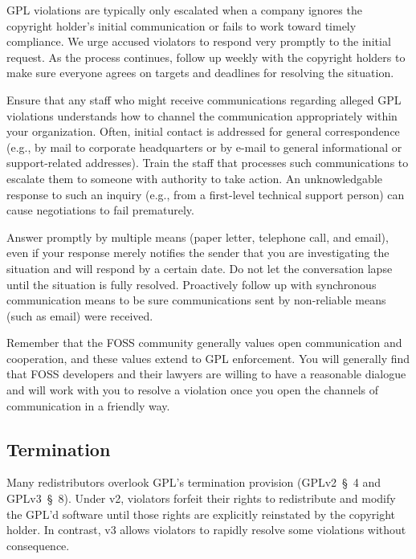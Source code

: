 \documentclass[letterpaper]{fixme}
\begin{document}
GPL violations are typically only escalated when a company ignores the
copyright holder's initial communication or fails to work toward timely
compliance.  We urge accused violators to respond very promptly to the
initial request.  As the process continues, follow up weekly with the
copyright holders to make sure everyone agrees on targets and deadlines
for resolving the situation.

Ensure that any staff who might receive communications regarding alleged
GPL violations understands how to channel the communication appropriately
within your organization.  Often, initial contact is addressed for general
correspondence (e.g., by mail to corporate headquarters or by e-mail to
general informational or support-related addresses).  Train the staff that
processes such communications to escalate them to someone with authority
to take action.  An unknowledgable response to such an inquiry (e.g., from
a first-level technical support person) can cause negotiations to fail
prematurely.

Answer promptly by multiple means (paper letter, telephone call, and
email), even if your response merely notifies the sender that you are
investigating the situation and will respond by a certain date.  Do not
let the conversation lapse until the situation is fully resolved.
Proactively follow up with synchronous communication means to be sure
communications sent by non-reliable means (such as email) were received.

Remember that the FOSS community generally values open communication and
cooperation, and these values extend to GPL enforcement.  You will
generally find that FOSS developers and their lawyers are willing to
have a reasonable dialogue and will work with you to resolve a violation
once you open the channels of communication in a friendly way.

\subsection{Termination}

Many redistributors overlook GPL's termination provision (GPLv2~\S~4 and
GPLv3~\S~8).  Under v2, violators forfeit their rights to redistribute and
modify the GPL'd software until those rights are explicitly reinstated by
the copyright holder.  In contrast, v3 allows violators to rapidly resolve
some violations without consequence.
\end{document}
